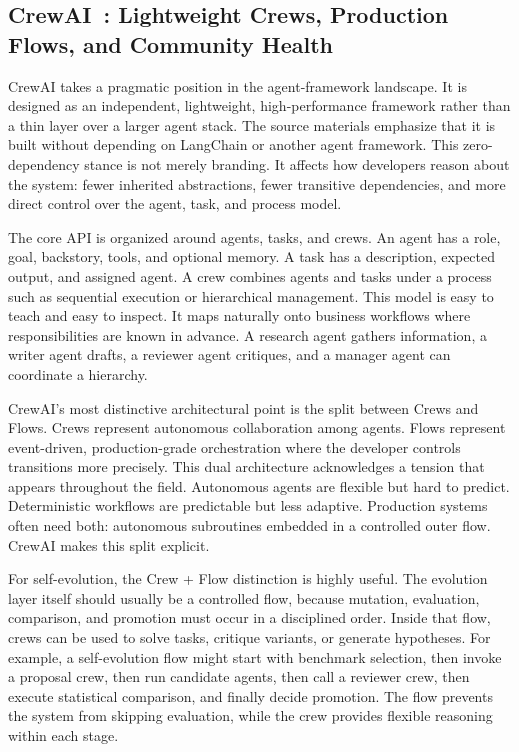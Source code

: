 \subsection{CrewAI~\cite{crewai2024}: Lightweight Crews, Production Flows, and Community Health}
\label{subsec:crewai}

CrewAI takes a pragmatic position in the agent-framework landscape.  It is designed as an independent, lightweight, high-performance framework rather than a thin layer over a larger agent stack.  The source materials emphasize that it is built without depending on LangChain or another agent framework.  This zero-dependency stance is not merely branding.  It affects how developers reason about the system: fewer inherited abstractions, fewer transitive dependencies, and more direct control over the agent, task, and process model.

The core API is organized around agents, tasks, and crews.  An agent has a role, goal, backstory, tools, and optional memory.  A task has a description, expected output, and assigned agent.  A crew combines agents and tasks under a process such as sequential execution or hierarchical management.  This model is easy to teach and easy to inspect.  It maps naturally onto business workflows where responsibilities are known in advance.  A research agent gathers information, a writer agent drafts, a reviewer agent critiques, and a manager agent can coordinate a hierarchy.

CrewAI's most distinctive architectural point is the split between Crews and Flows.  Crews represent autonomous collaboration among agents.  Flows represent event-driven, production-grade orchestration where the developer controls transitions more precisely.  This dual architecture acknowledges a tension that appears throughout the field.  Autonomous agents are flexible but hard to predict.  Deterministic workflows are predictable but less adaptive.  Production systems often need both: autonomous subroutines embedded in a controlled outer flow.  CrewAI makes this split explicit.

For self-evolution, the Crew + Flow distinction is highly useful.  The evolution layer itself should usually be a controlled flow, because mutation, evaluation, comparison, and promotion must occur in a disciplined order.  Inside that flow, crews can be used to solve tasks, critique variants, or generate hypotheses.  For example, a self-evolution flow might start with benchmark selection, then invoke a proposal crew, then run candidate agents, then call a reviewer crew, then execute statistical comparison, and finally decide promotion.  The flow prevents the system from skipping evaluation, while the crew provides flexible reasoning within each stage.

